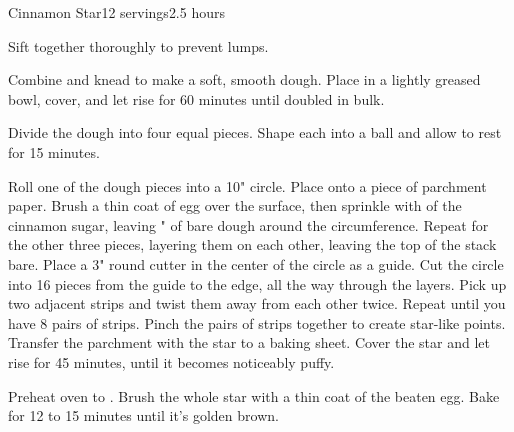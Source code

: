\documentclass[../Cookbook.tex]{subfiles}
\begin{document}
\begin{recipe}[CinnamonStar]{Cinnamon Star}{12 servings}{2.5 hours}

Sift together thoroughly to prevent lumps.

Combine and knead to make a soft, smooth dough.
Place in a lightly greased bowl, cover, and let rise for 60 minutes until doubled in bulk.

Divide the dough into four equal pieces.
Shape each into a ball and allow to rest for 15 minutes.

Roll one of the dough pieces into a 10" circle.
Place onto a piece of parchment paper.
Brush a thin coat of egg over the surface, then sprinkle with  of the cinnamon sugar, leaving " of bare dough around the circumference.
Repeat for the other three pieces, layering them on each other, leaving the top of the stack bare.
Place a 3" round cutter in the center of the circle as a guide.
Cut the circle into 16 pieces from the guide to the edge, all the way through the layers.
Pick up two adjacent strips and twist them away from each other twice.
Repeat until you have 8 pairs of strips.
Pinch the pairs of strips together to create star-like points.
Transfer the parchment with the star to a baking sheet.
Cover the star and let rise for 45 minutes, until it becomes noticeably puffy.

Preheat oven to .
Brush the whole star with a thin coat of the beaten egg.
Bake for 12 to 15 minutes until it's golden brown.

\end{recipe}
\end{document}
